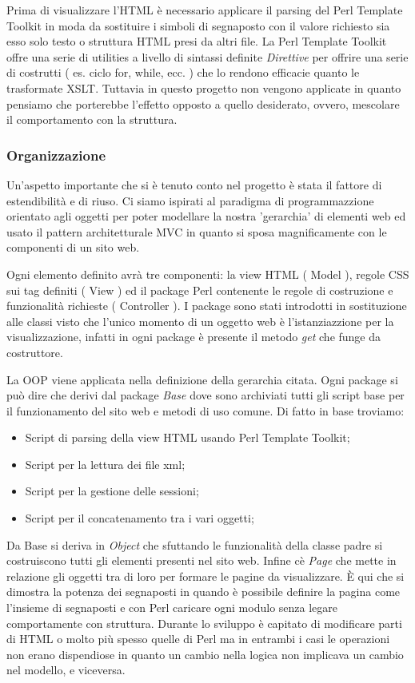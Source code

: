{Prima di visualizzare l'HTML \`e necessario applicare il parsing del Perl Template Toolkit in moda da sostituire i simboli di segnaposto con il valore richiesto sia esso solo testo o struttura HTML presi da altri file.
La Perl Template Toolkit offre una serie di utilities a livello di sintassi definite \textit{Direttive} per offrire una serie di costrutti ( es. ciclo for, while, ecc. ) che lo rendono efficacie quanto le trasformate XSLT. Tuttavia in questo progetto non vengono applicate in quanto pensiamo che porterebbe l'effetto opposto a quello desiderato, ovvero, mescolare il comportamento con la struttura.

\subsubsection{Organizzazione}
Un'aspetto importante che si \`e tenuto conto nel progetto \`e stata il fattore di estendibilit\`a e di riuso. Ci siamo ispirati al paradigma di programmazzione orientato agli oggetti per poter modellare la nostra 'gerarchia' di elementi web ed usato il pattern architetturale MVC in quanto si sposa magnificamente con le componenti di un sito web.

Ogni elemento definito avr\`a tre componenti: la view HTML ( Model ), regole CSS sui tag definiti ( View ) ed il package Perl contenente le regole di costruzione e funzionalit\`a richieste ( Controller ).
I package sono stati introdotti in sostituzione alle classi visto che l'unico momento di un oggetto web \`e l'istanziazzione per la visualizzazione, infatti in ogni package \`e presente il metodo \textit{get} che funge da costruttore.

La OOP viene applicata nella definizione della gerarchia citata. Ogni package si pu\`o dire che derivi dal package \textit{Base} dove sono archiviati tutti gli script base per il funzionamento del sito web e metodi di uso comune. Di fatto in base troviamo:
\begin{itemize}
\item Script di parsing della view HTML usando Perl Template Toolkit;
\item Script per la lettura dei file xml;
\item Script per la gestione delle sessioni;
\item Script per il concatenamento tra i vari oggetti;
\end{itemize}

Da Base si deriva in \textit{Object} che sfuttando le funzionalit\`a della classe padre si costruiscono tutti gli elementi presenti nel sito web. Infine c\`e \textit{Page} che mette in relazione gli oggetti tra di loro per formare le pagine da visualizzare. \`E qui che si dimostra la potenza dei segnaposti in quando \`e possibile definire la pagina come l'insieme di segnaposti e con Perl caricare ogni modulo senza legare comportamente con struttura.
Durante lo sviluppo \`e capitato di modificare parti di HTML o molto pi\`u spesso quelle di Perl ma in entrambi i casi le operazioni non erano dispendiose in quanto un cambio nella logica non implicava un cambio nel modello, e viceversa.

}

